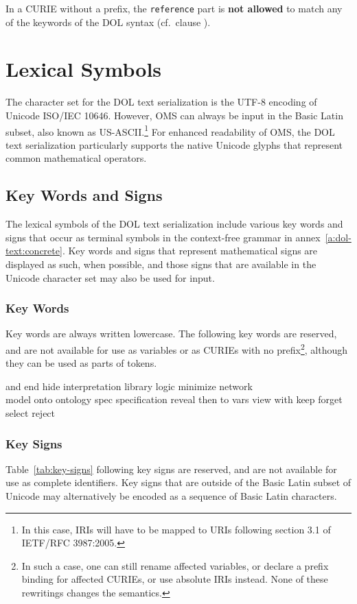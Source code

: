 \documentclass[10pt,fleqn,%
\ifpretendfinal
final%
\else
draft%
\fi,
]{scrreprt}
\makeatletter
\newcommand*\CommentAuthor{}
\renewcommand*\CommentAuthor{#1}}
\newcommand*\CommentDate{}
\renewcommand*\CommentDate{#1}}
\newcommand*\CommentId{}
\renewcommand*\CommentId{#1}}
\newcommand*\CommentType{}
\renewcommand*\CommentType{#1}}
\newcommand*{\SetCommentColorByType}[1]{%
\edef\localType{{#1}}%
\expandafter\ifstrequal\localType{q-aut}{\colorlet{CommentColor}{red}}{%
\expandafter\ifstrequal\localType{q-all}{\colorlet{CommentColor}{orange}}{%
\expandafter\ifstrequal\localType{todo}{\colorlet{CommentColor}{orange}}{%
\expandafter\ifstrequal\localType{fyi}{\colorlet{CommentColor}{lightgray}}{%
\colorlet{CommentColor}{yellow}}}}}}
\newcommand*{\SetCommentPrefixByType}[1]{%
\edef\localType{{#1}}%
\expandafter\@ifmtarg\localType{%
\edef\CommentPrefix{}%
}{%
\caseupper[q]{#1}%
\edef\CommentPrefix{\thestring: }%
}}
\newcommand*{\initComment}[1]{%
\setkeys{Comment}{#1}%
\SetCommentColorByType{\CommentType}%
\relax%
\SetCommentPrefixByType{\CommentType}%
\relax%
}
\newcommand*{\todonote}[2][]{%
\initComment{#1}%
\pdfcomment[author=\CommentAuthor,color=CommentColor,date=\CommentDate,id=\CommentId]{%
\CommentPrefix
#2}}
\renewcommand*{\todonote}[2][]{%
\initComment{#1}%
\ednote{\CommentPrefix #2}}
\newcommand*{\syntax}[1]{\texttt{#1}}
\newcommand*{\notallowed}{\textbf{not allowed}\xspace}
\newcommand{\annexrefname}{annex}
\newcommand{\aref}[1]{\annexrefname~\ref{#1}}
\newcommand{\sclause}[1]{\section{#1}}
\newcommand{\ssclause}[1]{\subsection{#1}}
\newcommand{\sssclause}[1]{\subsubsection{#1}}
\newcommand{\nisref}[1]{#1}
\makeatother
\begin{document}
In a CURIE without a prefix, the \syntax{reference} part is \notallowed to match any of the keywords of the DOL syntax (cf.\ clause \label{c:keywords}).

\sclause{Lexical Symbols}

The character set for the DOL text serialization is the UTF-8 encoding of Unicode \nisref{ISO/IEC 10646}.  However, OMS can always be input in the Basic Latin subset, also known as US-ASCII.\footnote{In this case, IRIs will have to be mapped to URIs following section 3.1 of \nisref{IETF/RFC 3987:2005}.}  For enhanced readability of OMS, the DOL text serialization particularly supports the native Unicode glyphs that represent common mathematical operators.%

\ssclause{Key Words and Signs}\label{c:keywords}

The lexical symbols of the DOL text serialization include various key words and signs that occur as terminal symbols in the context-free grammar in \aref{a:dol-text:concrete}.  Key words and signs that represent mathematical signs are displayed as such, when possible, and those signs that are available in the Unicode character set may also be used for input.

\sssclause{Key Words}

Key words are always written lowercase. The following key words are reserved, and are not available for use as variables or as CURIEs with no prefix\footnote{In such a case, one can still rename affected variables, or declare a prefix binding for affected CURIEs, or use absolute IRIs instead.  None of these rewritings changes the semantics.}, although they can be used as parts of tokens. 

{\ttfamily %
and
end
hide
interpretation
library
logic
minimize
network\\
model
onto
ontology
spec
specification
reveal
then
to
vars
view
with
keep
forget
select
reject
}

\sssclause{Key Signs}

Table~\ref{tab:key-signs} following key signs are reserved, and are not available for use as complete identifiers.  Key signs that are outside of the Basic Latin subset of Unicode may alternatively be encoded as a sequence of Basic Latin characters.
\end{document}
